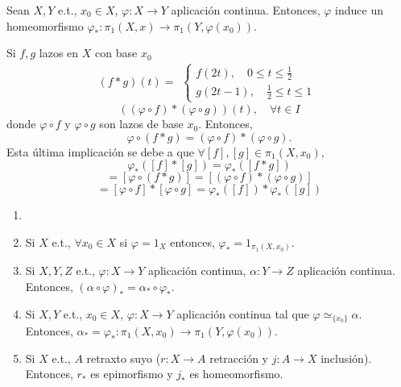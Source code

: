 \begin{prop}
  Sean $X, Y$ e.t., $x_{0} \in X$, $\varphi : X \to Y$ aplicación continua. Entonces, $\varphi$ induce un homeomorfismo $\varphi_*  : \pi_{1}(X,x) \to \pi_{1}(Y, \varphi(x_{0}))$.
\end{prop}

\begin{dem}
  Si $f,g$ lazos en $X$ con base $x_{0}$
  \[ 
    (f * g)(t) =
    \begin{aligned}
      \begin{cases}
        f(2t), \quad 0 \leq t \leq \frac{1}{2} \\
        g(2t - 1), \quad \frac{1}{2} \leq t \leq 1
      \end{cases}
    \end{aligned} 
  \] 
  \[ 
    ((\varphi \circ f) * (\varphi \circ g))(t), \quad \forall t \in I 
  \] 
  donde $\varphi \circ f$ y $\varphi \circ g$ son lazos de base $x_{0}$. Entonces,
  \[ 
    \varphi \circ (f * g) = (\varphi \circ f) * (\varphi \circ g).
  \] 
  Esta última implicación se debe a que $\forall [f], [g] \in \pi_{1}(X,x_{0}),$
  \[ 
    \varphi_* ([f] * [g] ) = \varphi_*([f * g]) 
  \] 
  \[ 
    = [\varphi \circ (f * g)] = [(\varphi \circ f) * (\varphi \circ g)]
  \] 
  \[ 
    = [\varphi \circ f] * [\varphi \circ g] = \varphi_*([f]) * \varphi_*([g]) 
  \] 
\end{dem}

\begin{prop}
  \begin{enumerate}[label=(\roman*)]
    \item []
    \item Si $X$ e.t., $\forall x_{0} \in X$ si $\varphi = 1_{X}$ entonces, $\varphi_* = 1_{\pi_{1}(X,x_{0})}$.
    \item Si $X, Y, Z$ e.t., $\varphi : X \to Y$ aplicación continua, $\alpha :  Y \to Z$ aplicación continua. Entonces, $(\alpha \circ \varphi)_* = \alpha_* \circ \varphi_*$.
    \item Si $X, Y$ e.t., $x_{0} \in X$, $\varphi : X \to Y$ aplicación continua tal que $\varphi \simeq_{\{ x_{0} \}} \alpha$. Entonces, $\alpha_* = \varphi_*  : \pi_{1}(X, x_{0}) \to \pi_{1}(Y, \varphi(x_{0}))$.
    \item Si $X$ e.t., $A$ retraxto suyo ($r : X \to A$ retracción y $j : A \to X$ inclusión). Entonces, $r_*$ es epimorfismo y $j_*$ es homeomorfismo.
  \end{enumerate}
\end{prop}

